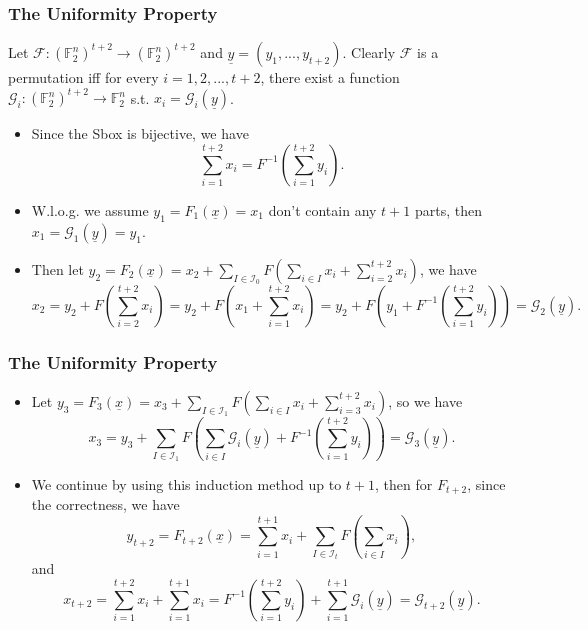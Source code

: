 \documentclass[
    aspectratio=169,                   %
]{beamer}
\newcommand{\F}{\mathbb{F}}
\begin{document}
    \begin{frame}
        \frametitle{The Uniformity Property}
    
        Let $ \mathcal{F}:(\F_2^n)^{t+2}\rightarrow(\F_2^n)^{t+2} $ and $ \underline{y}=(y_1,...,y_{t+2}) $. 
        Clearly $ \mathcal{F} $ is a permutation 
        iff for every $ i=1,2,...,t+2 $, there exist a function $ \mathcal{G}_i:(\F_2^n)^{t+2}\rightarrow\F_2^n $ s.t. $ x_i=\mathcal{G}_i(\underline{y}) $. 

        \begin{itemize}
            \item Since the Sbox is bijective, we have \[\sum_{i=1}^{t+2}x_i=F^{-1}\left( \sum_{i=1}^{t+2}y_i \right).\]
            \item W.l.o.g. we assume $ y_1=F_1(\underline{x})=x_1 $ don't contain any $ t+1 $ parts, then $ x_1=\mathcal{G}_1(\underline{y})=y_1 $. 
            \item Then let $ y_2=F_2(\underline{x})=x_2+\sum_{I\in\mathcal{I}_0}F\left( \sum_{i\in I}x_i+\sum_{i=2}^{t+2}x_i \right) $, we have 
            \[x_2=y_2+F\left( \sum_{i=2}^{t+2}x_i \right)=y_2+F\left(x_1+ \sum_{i=1}^{t+2}x_i\right)=y_2+F\left(y_1+ F^{-1}\left( \sum_{i=1}^{t+2}y_i \right)\right)=\mathcal{G}_2(\underline{y}).\]
        \end{itemize}
    \end{frame}

    \begin{frame}
        \frametitle{The Uniformity Property}
    
        \begin{itemize}
            \item Let $ y_3=F_3(\underline{x})=x_3+ \sum_{I\in\mathcal{I}_1}F\left( \sum_{i\in I}x_i+\sum_{i=3}^{t+2}x_i \right) $, so we have 
            \[x_3=y_3+\sum_{I\in\mathcal{I}_1}F\left( \sum_{i\in I}\mathcal{G}_i(\underline{y})+ F^{-1}\left( \sum_{i=1}^{t+2}y_i \right)\right)=\mathcal{G}_3(\underline{y}).\]
            \item We continue by using this induction method up to $ t+1 $, then for $ F_{t+2} $, since the correctness, we have  
            \[y_{t+2}=F_{t+2}(\underline{x})=\sum_{i=1}^{t+1}x_i+\sum_{I\in\mathcal{I}_t}F\left( \sum_{i\in I}x_i \right),\]
            and 
            \[x_{t+2}=\sum_{i=1}^{t+2}x_i+\sum_{i=1}^{t+1}x_i=F^{-1}\left( \sum_{i=1}^{t+2}y_i \right)+\sum_{i=1}^{t+1}\mathcal{G}_i(\underline{y})=\mathcal{G}_{t+2}(\underline{y}).\]
        \end{itemize}
    
    \end{frame}
\end{document}
